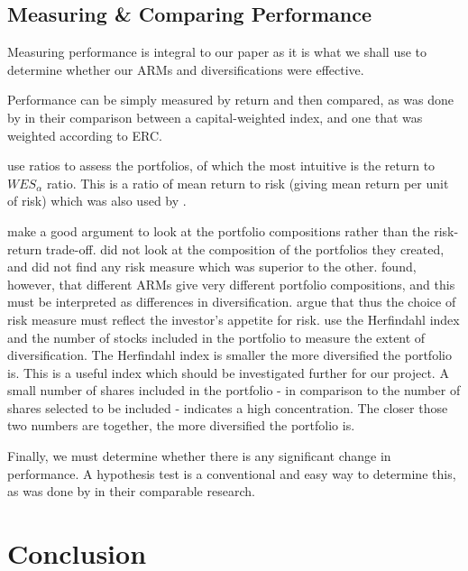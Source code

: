 \documentclass[12pt,a4paper]{article}
\begin{document}
\subsection{Measuring \& Comparing Performance}
\label{subsec:Performance}

Measuring performance is integral to our paper as it is what we shall use to determine whether our ARMs and diversifications were effective. 

Performance can be simply measured by return and then compared, as was done by \cite{bruder2012managing} in their comparison between a capital-weighted index, and one that was weighted according to ERC.

\cite{CHEN20111777} use ratios to assess the portfolios, of which the most intuitive is the  return to $WES_{\alpha}$ ratio. This is a ratio of mean return to risk (giving mean return per unit of risk) which was also used by \cite{hoe2010empirical}. 

\cite{byrne2004different} make a good argument to look at the portfolio compositions rather than the risk-return trade-off.  \cite{righi2017simulation} did not look at the composition of the portfolios they created, and did not find any risk measure which was superior to the other. \cite{byrne2004different} found, however, that different ARMs give very different portfolio compositions, and this must be interpreted as differences in diversification. \cite{byrne2004different} argue that thus the choice of risk measure must reflect the investor's appetite for risk. \cite{CHEN20111777} use the Herfindahl index and the number of stocks included in the portfolio to measure the extent of diversification. The Herfindahl index is smaller the more diversified the portfolio is. This is a useful index which should be investigated further for our project. A small number of shares included in the portfolio - in comparison to the number of shares selected to be included - indicates a high concentration. The closer those two numbers are together, the more diversified the portfolio is.

Finally, we must determine whether there is any significant change in performance. A hypothesis test is a conventional and easy way to determine this, as was done by \cite{righi2017simulation} in their comparable research.

\section{Conclusion}
\label{sec:Concl}
\end{document}
